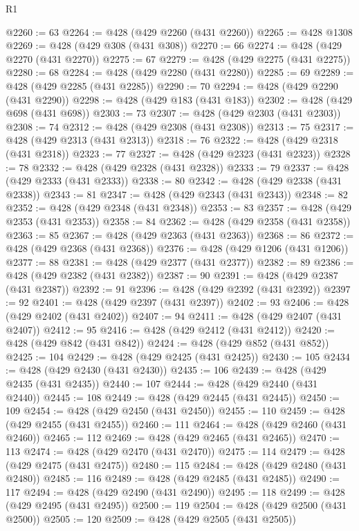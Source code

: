 \begin{lexlean}{R1}
\begin{coremodule}
@2260 := 63
@2264 := @428 (@429 @2260 (@431 @2260))
@2265 := @428 @1308
@2269 := @428 (@429 @308 (@431 @308))
@2270 := 66
@2274 := @428 (@429 @2270 (@431 @2270))
@2275 := 67
@2279 := @428 (@429 @2275 (@431 @2275))
@2280 := 68
@2284 := @428 (@429 @2280 (@431 @2280))
@2285 := 69
@2289 := @428 (@429 @2285 (@431 @2285))
@2290 := 70
@2294 := @428 (@429 @2290 (@431 @2290))
@2298 := @428 (@429 @183 (@431 @183))
@2302 := @428 (@429 @698 (@431 @698))
@2303 := 73
@2307 := @428 (@429 @2303 (@431 @2303))
@2308 := 74
@2312 := @428 (@429 @2308 (@431 @2308))
@2313 := 75
@2317 := @428 (@429 @2313 (@431 @2313))
@2318 := 76
@2322 := @428 (@429 @2318 (@431 @2318))
@2323 := 77
@2327 := @428 (@429 @2323 (@431 @2323))
@2328 := 78
@2332 := @428 (@429 @2328 (@431 @2328))
@2333 := 79
@2337 := @428 (@429 @2333 (@431 @2333))
@2338 := 80
@2342 := @428 (@429 @2338 (@431 @2338))
@2343 := 81
@2347 := @428 (@429 @2343 (@431 @2343))
@2348 := 82
@2352 := @428 (@429 @2348 (@431 @2348))
@2353 := 83
@2357 := @428 (@429 @2353 (@431 @2353))
@2358 := 84
@2362 := @428 (@429 @2358 (@431 @2358))
@2363 := 85
@2367 := @428 (@429 @2363 (@431 @2363))
@2368 := 86
@2372 := @428 (@429 @2368 (@431 @2368))
@2376 := @428 (@429 @1206 (@431 @1206))
@2377 := 88
@2381 := @428 (@429 @2377 (@431 @2377))
@2382 := 89
@2386 := @428 (@429 @2382 (@431 @2382))
@2387 := 90
@2391 := @428 (@429 @2387 (@431 @2387))
@2392 := 91
@2396 := @428 (@429 @2392 (@431 @2392))
@2397 := 92
@2401 := @428 (@429 @2397 (@431 @2397))
@2402 := 93
@2406 := @428 (@429 @2402 (@431 @2402))
@2407 := 94
@2411 := @428 (@429 @2407 (@431 @2407))
@2412 := 95
@2416 := @428 (@429 @2412 (@431 @2412))
@2420 := @428 (@429 @842 (@431 @842))
@2424 := @428 (@429 @852 (@431 @852))
@2425 := 104
@2429 := @428 (@429 @2425 (@431 @2425))
@2430 := 105
@2434 := @428 (@429 @2430 (@431 @2430))
@2435 := 106
@2439 := @428 (@429 @2435 (@431 @2435))
@2440 := 107
@2444 := @428 (@429 @2440 (@431 @2440))
@2445 := 108
@2449 := @428 (@429 @2445 (@431 @2445))
@2450 := 109
@2454 := @428 (@429 @2450 (@431 @2450))
@2455 := 110
@2459 := @428 (@429 @2455 (@431 @2455))
@2460 := 111
@2464 := @428 (@429 @2460 (@431 @2460))
@2465 := 112
@2469 := @428 (@429 @2465 (@431 @2465))
@2470 := 113
@2474 := @428 (@429 @2470 (@431 @2470))
@2475 := 114
@2479 := @428 (@429 @2475 (@431 @2475))
@2480 := 115
@2484 := @428 (@429 @2480 (@431 @2480))
@2485 := 116
@2489 := @428 (@429 @2485 (@431 @2485))
@2490 := 117
@2494 := @428 (@429 @2490 (@431 @2490))
@2495 := 118
@2499 := @428 (@429 @2495 (@431 @2495))
@2500 := 119
@2504 := @428 (@429 @2500 (@431 @2500))
@2505 := 120
@2509 := @428 (@429 @2505 (@431 @2505))

\end{coremodule}
\end{lexlean}
